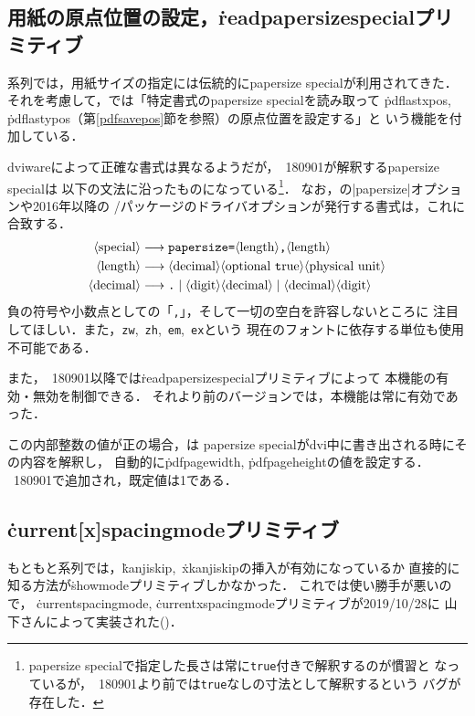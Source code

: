 \documentclass[a4paper,11pt,nomag,dvipdfmx]{jsarticle}
\begin{document}
\subsection{用紙の原点位置の設定，\.{readpapersizespecial}プリミティブ}\label{readpss}
\pTeX 系列では，用紙サイズの指定には伝統的にpapersize specialが利用されてきた．
それを考慮して，\epTeX では「特定書式のpapersize specialを読み取って
\.{pdflastxpos}, \.{pdflastypos}（第\ref{pdfsavepos}節を参照）の原点位置を設定する」と
いう機能を付加している．
\begin{dangerous}
  dviwareによって正確な書式は異なるようだが，\epTeX~180901が解釈するpapersize specialは
  以下の文法に沿ったものになっている\footnote{%
  papersize specialで指定した長さは常に\texttt{true}付きで解釈するのが慣習と
  なっているが，\epTeX~180901より前では\texttt{true}なしの寸法として解釈するという
  バグが存在した．}．
  なお，の|papersize|オプションや2016年以降の
  /パッケージのドライバオプションが発行する書式は，これに合致する．
\def\<#1>{\langle\mbox{#1}\rangle}
\begin{align*}
  \<special> &\longrightarrow \texttt{papersize=}\<length>\texttt{,}\<length>\\
  \<length>  &\longrightarrow \<decimal>
    \<optional~\texttt{true}>\<physical unit>\\
  \<decimal> &\longrightarrow \texttt{.} \mid \<digit>\<decimal> \mid
    \<decimal>\<digit>
\end{align*}
  負の符号や小数点としての「\texttt{,}」，そして一切の空白を許容しないところに
  注目してほしい．また，\texttt{zw},~\texttt{zh},~\texttt{em},~\texttt{ex}という
  現在のフォントに依存する単位も使用不可能である．
\end{dangerous}

また，\epTeX~180901以降では\.{readpapersizespecial}プリミティブによって
本機能の有効・無効を制御できる．
それより前のバージョンでは，本機能は常に有効であった．

\begin{cslist}
  この内部整数の値が正の場合，\epTeX は
  papersize specialがdvi中に書き出される時にその内容を解釈し，
  自動的に\.{pdfpagewidth}, \.{pdfpageheight}の値を設定する．
  \epTeX~180901で追加され，既定値は1である．
\end{cslist}


\subsection{\.{current[x]spacingmode}プリミティブ}
もともと\pTeX 系列では，\.{kanjiskip},~\.{xkanjiskip}の挿入が有効になっているか
直接的に知る方法が\.{showmode}プリミティブしかなかった．
これでは使い勝手が悪いので，
\.{currentspacingmode}, \.{currentxspacingmode}プリミティブが2019/10/28に
山下さんによって実装された(\cite{tjb94})．
\end{document}
